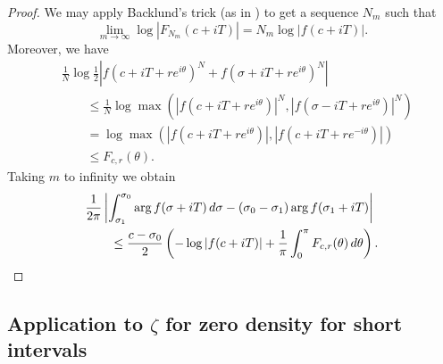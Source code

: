 \documentclass[10pt,english,letter, reqno]{amsart}
\theoremstyle{plain}
\theoremstyle{definition}
\begin{document}
\begin{proof}
We may apply Backlund's trick (as in \cite[Lemma~3.3]{HasanalizadeShenWong2022}) to get a sequence $N_m$ such that
\[ \lim_{m\rightarrow\infty} \log|F_{N_m}(c + iT)|  = N_m \log|f(c+iT)|. \]
Moreover, we have
\begin{align*}
  &\frac{1}{N}\log \frac{1}{2}\left| f(c + iT + re^{i\theta})^N + f(\sigma + iT + re^{i\theta})^N\right|\\ &\qquad \leq 
   \frac{1}{N}\log \max\left(\left|f(c + iT + re^{i\theta})\right|^N, \left|f(\sigma - iT + re^{i\theta})\right|^N\right) \\ 
  &\qquad = \log \max\left(\left|f(c + iT + re^{i\theta})\right|, \left|f(c + iT + re^{-i\theta})\right|\right) \\
  &\qquad \leq F_{c,r}(\theta). 
\end{align*}
Taking $m$ to infinity we obtain
\begin{align*}
&\frac{1}{2\pi}\left|\int_{\sigma_1}^{\sigma_0} \arg f(\sigma+iT)\,d\sigma
- (\sigma_0-\sigma_1)\arg f(\sigma_1+iT)\right|\\&\qquad\leq
\frac{c-\sigma_0}{2}\left(-\log|f(c + iT)|
+  \frac{1}{\pi}\int_{0}^\pi F_{c,r}(\theta)\,d\theta\right) .\qedhere
\end{align*}
\end{proof}

\subsection{Application to $\zeta$ for zero density for short intervals}\label{sec:littlewoodshortapp}
\end{document}

